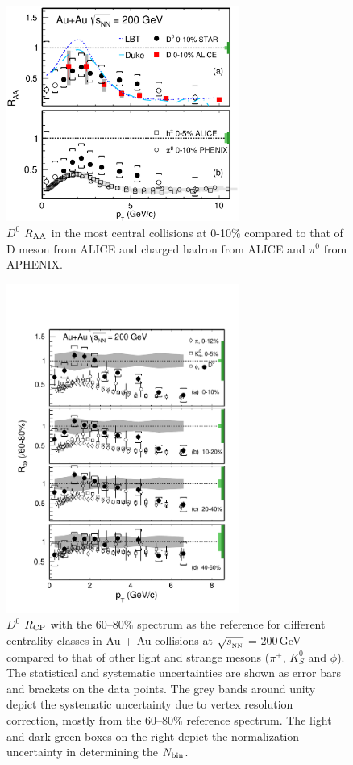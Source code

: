 \begin{figure}
\centering
\includegraphics[width=0.68\textwidth]{figure/Run14_D0HFT/D0_RAA_LHC.eps}
\caption{$D^{0}$ $R_{\rm AA}$ in the most central collisions at 0-10\% compared to that of D meson from ALICE and charged hadron from ALICE and $\pi^0$ from APHENIX.}
\label{D0_RAA_LHC} 
\end{figure}

\begin{figure}
\centering
\includegraphics[width=0.68\textwidth]{figure/Run14_D0HFT/D0_Rcp1.pdf}
\caption{$D^{0}$ $R_{\rm CP}$ with the 60--80\% spectrum as the reference for different centrality classes in Au + Au collisions at $\sqrt{s_{_{\rm NN}}}$ = 200\,GeV compared to that of other light and strange mesons ($\pi^{\pm}$, $K^0_{S}$ and $\phi$). The statistical and systematic uncertainties are shown as error bars and brackets on the data points. The grey bands around unity depict the systematic uncertainty due to vertex resolution correction, mostly from the 60--80\% reference spectrum. The light and dark green boxes on the right depict the normalization uncertainty in determining the $N_{\rm bin}$.}
\label{D0_Rcp} 
\end{figure}

